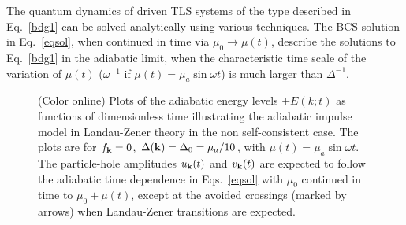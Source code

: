 \documentclass[aps,pra,floats,epsfig,pdflatex]{revtex4}                                                              %
\begin{document}
 {The quantum dynamics of driven TLS systems of the type described in Eq.}~\ref{bdg1}  {can be solved analytically using various techniques.
The BCS solution in Eq.}~\ref{eqsol},  {when continued in time via $\mu_0\rightarrow\mu(t)$, describe the solutions to Eq.}~\ref{bdg1} { in the adiabatic limit, when the characteristic time scale of the variation of $\mu(t)$ ($\omega^{-1}$ if $\mu(t)=\mu_a\sin{\omega t}$) is much larger than $\Delta^{-1}$.}
\begin{figure}
\caption{(Color online) Plots of the adiabatic energy levels $\pm E(k;t)$ as functions of dimensionless time illustrating the adiabatic impulse model in Landau-Zener theory in the non self-consistent case. The plots are for $f_{\bf k}=0$, $\Delta({\bf k})=\Delta_0=\mu_a/10$, with $\mu(t)=\mu_a\sin{\omega t}$. The particle-hole amplitudes $u_{\bf k}(t)$ and $v_{\bf k}(t)$ are expected to follow the adiabatic time dependence in Eqs.~\ref{eqsol} with $\mu_0$ continued in time to $\mu_0+\mu(t)$, except at the avoided crossings (marked by arrows) when Landau-Zener transitions are expected.}
\label{avcrossfig}
\end{figure}
\end{document}
